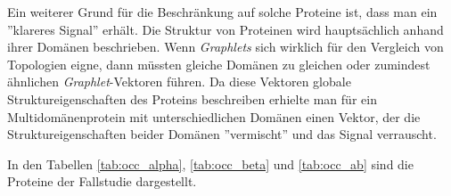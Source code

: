 \documentclass{report}
\begin{document}
Ein weiterer Grund f\"ur die Beschr\"ankung auf solche Proteine ist, dass man ein ''klareres Signal'' erh\"alt. Die Struktur von Proteinen wird haupts\"achlich anhand ihrer Dom\"anen beschrieben. Wenn \textit{Graphlets} sich wirklich f\"ur den Vergleich von Topologien eigne, dann m\"ussten gleiche Dom\"anen zu gleichen oder zumindest \"ahnlichen \textit{Graphlet}-Vektoren f\"uhren.
Da diese Vektoren globale Struktureigenschaften des Proteins beschreiben erhielte man f\"ur ein Multidom\"anenprotein mit unterschiedlichen Dom\"anen einen Vektor, der die Struktureigenschaften beider Dom\"anen ''vermischt'' und das Signal verrauscht.


In den Tabellen \ref{tab:occ_alpha}, \ref{tab:occ_beta} und \ref{tab:occ_ab} sind die Proteine der Fallstudie dargestellt.





\end{document}

